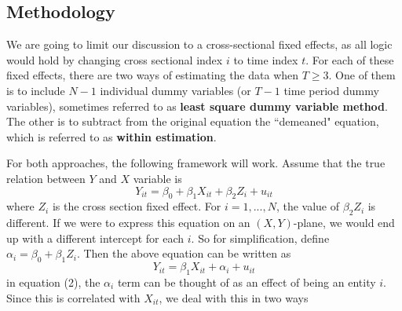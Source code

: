 \documentclass[12pt]{article}
\theoremstyle{definition}
\theoremstyle{property}
\theoremstyle{assumption}
\theoremstyle{example}
\theoremstyle{comment}
\begin{document}
\subsection{Methodology}
We are going to limit our discussion to a cross-sectional fixed effects, as all logic would hold by changing cross sectional index $i$ to time index $t$. For each of these fixed effects, there are two ways of estimating the data when $T\geq 3$. One of them is to include $N-1$ individual dummy variables (or $T-1$ time period dummy variables), sometimes referred to as \textbf{least square dummy variable method}. The other is to subtract from the original equation the ``demeaned" equation, which is referred to as \textbf{within estimation}. \par\medskip
For both approaches, the following framework will work. Assume that the true relation between $Y$ and $X$ variable is 
\[
Y_{it}=\beta_0 + \beta_1X_{it}+\beta_2 Z_{i}+u_{it} \tag{1}
\]
where $Z_i$ is the cross section fixed effect. For $i=1,...,N$, the value of $\beta_2 Z_i$ is different. If we were to express this equation on an $(X,Y)$-plane, we would end up with a different intercept for each $i$. So for simplification, define $\alpha_i = \beta_0 + \beta_1Z_i$. Then the above equation can be written as
\[
Y_{it}=\beta_1X_{it}+\alpha_{i}+u_{it} \tag{2}
\]
in equation (2), the $\alpha_i$ term can be thought of as an effect of being an entity $i$. Since this is correlated with $X_{it}$, we deal with this in two ways
\end{document}
